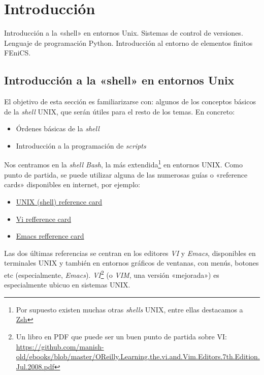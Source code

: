
\section{Introducción}

\begin{contenidos}
  Introducción a la «shell» en entornos Unix. Sistemas
  de control de versiones. Lenguaje de programación
  Python. Introducción al entorno de elementos finitos
  FEniCS.
\end{contenidos}

\subsection{Introducción a la «shell» en entornos Unix}
\label{sec:intr-la-shell}

El objetivo de esta sección es familiarizarse con: algunos de los
conceptos básicos de la \textit{shell} UNIX, que serán útiles para el
resto de los temas. En concreto:
\begin{itemize}
\item Órdenes básicas de la \textit{shell}
\item Introducción a la programación de \textit{scripts}
\end{itemize}

Nos centramos en la \textit{shell Bash}, la más extendida\footnote{Por
  supuesto existen muchas otras \textit{shells} UNIX, entre ellas
  destacamos a \href{https://www.zsh.org/}{Zsh}} en entornos
UNIX. Como punto de partida, se puede utilizar alguna de las numerosas
guías o «reference cards» disponibles en internet, por ejemplo:
\begin{itemize}
\item \href{https://www.cs.jhu.edu/~joanne/unixRC.pdf}{UNIX (shell) reference card}
\item \href{http://web.mit.edu/merolish/Public/vi-ref.pdf}{Vi refference card}
\item \href{https://www.gnu.org/software/emacs/refcards/pdf/refcard.pdf}{Emacs refference card}
\end{itemize}

Las dos últimas referencias se centran en los editores \textit{VI} y
\textit{Emacs}, disponibles en terminales UNIX y también en entornos
gráficos de ventanas, con menús, botones etc (especialmente,
\textit{Emacs}). \textit{VI}\footnote{Un libro en PDF que puede ser un
  buen punto de partida sobre VI:
  \url{https://github.com/manish-old/ebooks/blob/master/OReilly.Learning.the.vi.and.Vim.Editors.7th.Edition.Jul.2008.pdf}}
(o \textit{VIM}, una versión «mejorada») es especialmente ubicuo en
sistemas UNIX.

